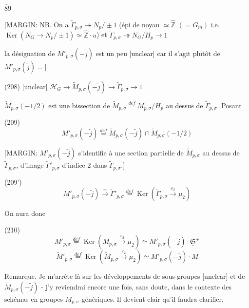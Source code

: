 \newpage


$\tilde{89}$

[MARGIN: 
NB. On a $\tilde{\Gamma}_{p,\sigma} \twoheadrightarrow N_p/\pm 1$ 
(épi de noyau $\simeq \hat{\mathbb{Z}}$ $(= G_m)$ i.e. $\operatorname{Ker}(N_G \to N_p / \pm 1) \simeq \hat{\mathbb{Z}} \cdot u$) 
et $\tilde{\Gamma}_{p,\sigma} \twoheadrightarrow N_G / H_p \to 1$

la désignation de $M'_{p,\sigma}(-\tilde{j})$ est un peu [unclear] car il s'agit plutôt de $M'_{p,\sigma}(\tilde{j})$ \dots
]

(208) [unclear] $\mathcal{H}_G \longrightarrow \tilde{M}_{p,\sigma}(-\tilde{j}) \longrightarrow \tilde{\Gamma}_{p,\sigma} \longrightarrow 1$

$\tilde{M}_{p,\sigma}(-1/2)$ est une bissection de $\tilde{M}_{p,\sigma} \overset{def}{=} M_{p,\sigma} / H_p$ au dessus de $\tilde{\Gamma}_{p,\sigma}$. Posant

(209) $$M'_{p,\sigma}(-\tilde{j}) \overset{def}{=} \tilde{M}_{p,\sigma}(-\tilde{j}) \cap \tilde{M}_{p,\sigma}(-1/2)$$

[MARGIN: $M'_{p,\sigma}(-\tilde{j})$ s'identifie à une section partielle de $\tilde{M}_{p,\sigma}$ au dessus de $\tilde{\Gamma}_{p,\sigma}$, d'image $\tilde{\Gamma}'_{p,\sigma}$ d'indice 2 dans $\tilde{\Gamma}_{p,\sigma}$.]

(209') $$M'_{p,\sigma}(-\tilde{j}) \overset{\sim}{\longrightarrow} \tilde{\Gamma}'_{p,\sigma} \overset{def}{=} \operatorname{Ker}(\tilde{\Gamma}_{p,\sigma} \overset{\varepsilon_2}{\longrightarrow} \mu_2)$$

On aura donc

(210) 
$$M'_{p,\sigma} \overset{def}{=} \operatorname{Ker}(M_{p,\sigma} \overset{\varepsilon_2}{\longrightarrow} \mu_2) \simeq M'_{p,\sigma}(-\tilde{j}) \cdot \underline{\mathfrak{S}}^+$$
$$\tilde{M}'_{p,\sigma} \overset{def}{=} \operatorname{Ker}(\tilde{M}_{p,\sigma} \overset{\varepsilon_2}{\longrightarrow} \mu_2) \simeq M'_{p,\sigma}(-\tilde{j}) \cdot \underline{M}$$

Remarque. Je m'arrête là sur les développements de sous-groupes [unclear] et de $\tilde{M}_{p,\sigma}(-\tilde{j})$ - j'y reviendrai encore une fois, sans doute, dans le contexte des schémas en groupes $M_{p,\sigma}$ génériques. Il devient clair qu'il faudra clarifier,

\newpage


